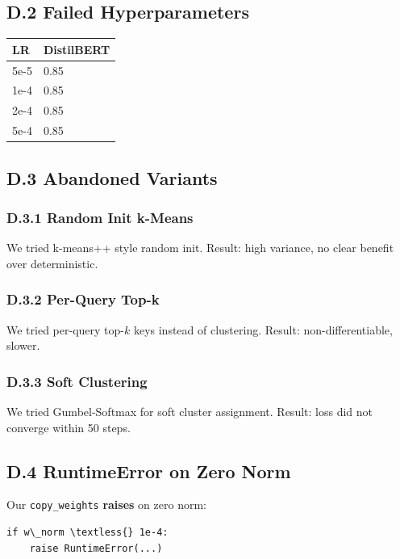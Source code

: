 \subsection{D.2 Failed Hyperparameters}

\begin{table}[H]
\centering
\small
\begin{tabular}{ll}
\toprule
\textbf{LR} & \textbf{DistilBERT} \\
\midrule
5e-5 & 0.85 \\
1e-4 & 0.85 \\
2e-4 & 0.85 \\
5e-4 & 0.85 \\
\bottomrule
\end{tabular}
\end{table}

\subsection{D.3 Abandoned Variants}

\subsubsection{D.3.1 Random Init k-Means}

We tried k-means++ style random init. Result: high variance, no clear 
benefit over deterministic.

\subsubsection{D.3.2 Per-Query Top-k}

We tried per-query top-$k$ keys instead of clustering. Result: non-differentiable, 
slower.

\subsubsection{D.3.3 Soft Clustering}

We tried Gumbel-Softmax for soft cluster assignment. Result: loss did not 
converge within 50 steps.

\subsection{D.4 RuntimeError on Zero Norm}

Our \texttt{copy\_weights} \textbf{raises} on zero norm:

\begin{lstlisting}
if w\_norm \textless{} 1e-4:
    raise RuntimeError(...)
\end{lstlisting}

